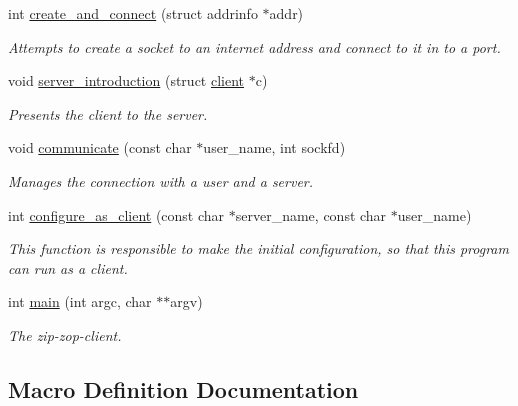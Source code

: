 \begin{DoxyCompactItemize}
int \hyperlink{zip-zop-client_8c_aff1f8c91603968e32da45fc6ef4bad4d}{create\+\_\+and\+\_\+connect} (struct addrinfo $\ast$addr)
\begin{DoxyCompactList}\small\item\em Attempts to create a socket to an internet address and connect to it in to a port. \end{DoxyCompactList}\item 
void \hyperlink{zip-zop-client_8c_acb0e43d47379736b891394dd383064be}{server\+\_\+introduction} (struct \hyperlink{structclient}{client} $\ast$c)
\begin{DoxyCompactList}\small\item\em Presents the client to the server. \end{DoxyCompactList}\item 
void \hyperlink{zip-zop-client_8c_a1c3a34b362da4351d526c8af94b228c6}{communicate} (const char $\ast$user\+\_\+name, int sockfd)
\begin{DoxyCompactList}\small\item\em Manages the connection with a user and a server. \end{DoxyCompactList}\item 
int \hyperlink{zip-zop-client_8c_a47f6ebba2e3673104b958f2f6c6aff1b}{configure\+\_\+as\+\_\+client} (const char $\ast$server\+\_\+name, const char $\ast$user\+\_\+name)
\begin{DoxyCompactList}\small\item\em This function is responsible to make the initial configuration, so that this program can run as a client. \end{DoxyCompactList}\item 
int \hyperlink{zip-zop-client_8c_a3c04138a5bfe5d72780bb7e82a18e627}{main} (int argc, char $\ast$$\ast$argv)
\begin{DoxyCompactList}\small\item\em The zip-\/zop-\/client. \end{DoxyCompactList}\end{DoxyCompactItemize}


\subsection{Macro Definition Documentation}
\mbox{\label{zip-zop-client_8c_aa2dfc63100e2bed7efb1b0cd09dea107}} 
